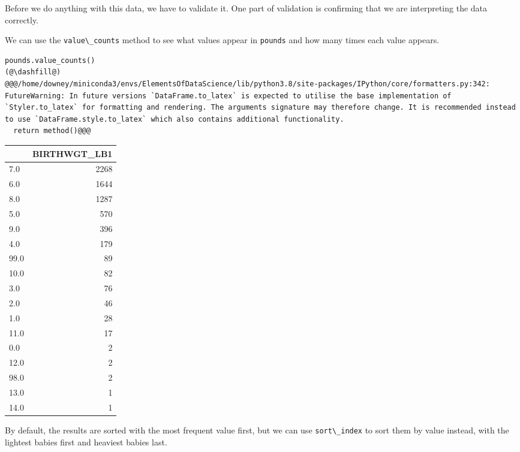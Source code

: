 Before we do anything with this data, we have to validate it. One part
of validation is confirming that we are interpreting the data correctly.

We can use the \passthrough{\lstinline!value\_counts!} method to see
what values appear in \passthrough{\lstinline!pounds!} and how many
times each value appears.

\begin{lstlisting}[]
pounds.value_counts()
(@\dashfill@)
@@@/home/downey/miniconda3/envs/ElementsOfDataScience/lib/python3.8/site-packages/IPython/core/formatters.py:342: FutureWarning: In future versions `DataFrame.to_latex` is expected to utilise the base implementation of `Styler.to_latex` for formatting and rendering. The arguments signature may therefore change. It is recommended instead to use `DataFrame.style.to_latex` which also contains additional functionality.
  return method()@@@
\end{lstlisting}

\begin{tabular}{lr}
\midrule
{} &  BIRTHWGT\_LB1 \\
\midrule
7.0  &          2268 \\
6.0  &          1644 \\
8.0  &          1287 \\
5.0  &           570 \\
9.0  &           396 \\
4.0  &           179 \\
99.0 &            89 \\
10.0 &            82 \\
3.0  &            76 \\
2.0  &            46 \\
1.0  &            28 \\
11.0 &            17 \\
0.0  &             2 \\
12.0 &             2 \\
98.0 &             2 \\
13.0 &             1 \\
14.0 &             1 \\
\midrule
\end{tabular}

By default, the results are sorted with the most frequent value first,
but we can use \passthrough{\lstinline!sort\_index!} to sort them by
value instead, with the lightest babies first and heaviest babies last.

